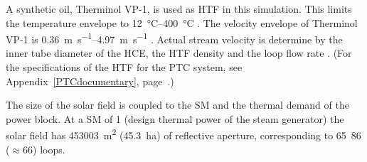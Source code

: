 A synthetic oil, Therminol VP-1, is used as \ac{HTF} in this simulation. This limits the temperature envelope to \SIrange{12}{400}{\celsius} \cite{Therminol2015}. The velocity envelope of Therminol VP-1 is \SIrange{0.36}{4.97}{\meter\per\second} \cite{Wagner2014}. Actual stream velocity is determine by the inner tube diameter of the \ac{HCE}, the \ac{HTF} density and the loop flow rate \cite{NREL2015a}. (For the specifications of the \ac{HTF} for the \ac{PTC} system, see Appendix~\ref{PTCdocumentary}, page~\pageref{PTC_HTF}.) 


The size of the solar field is coupled to the \ac{SM} and the thermal demand of the power block. At a \ac{SM} of \si{1} (design thermal power of the steam generator) the solar field has \SI{453003}{\square\metre} (\SI{45.3}{\hectare}) of reflective aperture, corresponding to \si{65.86} ($\approx$66) loops.


